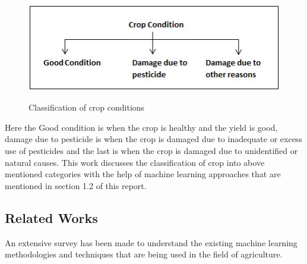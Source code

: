 \documentclass[12pt]{article}
\begin{document}
\begin{figure}[hbt!]
\center
{\includegraphics[scale=0.7]{cat.jpg}}
\caption{Classification of crop conditions}
\end{figure}

Here the Good condition is when the crop is healthy and the yield is good, damage due to pesticide is when the crop is damaged due to inadequate or excess use of pesticides and the last is when the crop is damaged due to unidentified or natural causes. This work discusses the classification of crop into above mentioned categories with the help of machine learning approaches that are mentioned in section 1.2 of this report.

	\subsection{Related Works }
	An extensive survey has been made to understand the existing machine learning methodologies and techniques that are being used in the field of agriculture.
	
\end{document}
